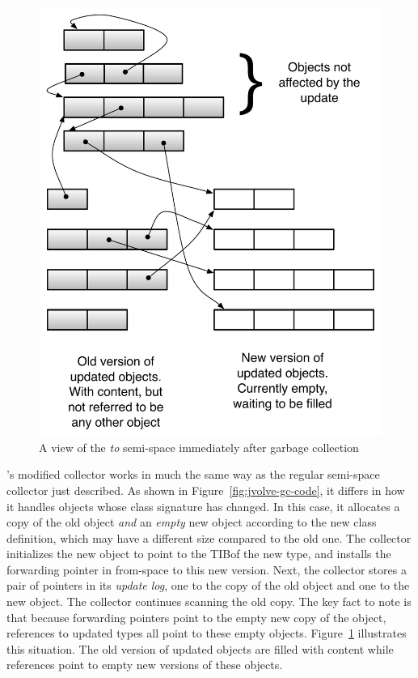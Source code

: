 

\begin{figure}[p]
\centering
\includegraphics[scale=0.35]{100-images/to-space-after-gc}
\caption{A view of the \emph{to} semi-space immediately after garbage
collection\label{fig:to-space-after-gc}}
\end{figure}

\JV's modified collector works in much the same way as the regular
semi-space collector just described. As shown in
Figure~\ref{fig:jvolve-gc-code}, it differs in how it handles objects whose
class signature has changed.  In this case, it allocates a copy of the old
object \emph{and} an \emph{empty} new object according to the new class
definition, which may
have a different size compared to the old one. The collector initializes
the new object to point to the \acf{TIB}\iTIB of the new type, and installs the
forwarding pointer in from-space to this new version.  Next, the collector
stores a pair of pointers in its \emph{update log}, one to the copy of the
old object and one to the new object.  The collector continues scanning the
old copy. The key fact to note is that because forwarding pointers point to
the empty new copy of the object, references to updated types all point to
these empty objects.  Figure~\ref{fig:to-space-after-gc} illustrates this
situation. The old version of updated objects are filled with content while
references point to empty new versions of these objects.

